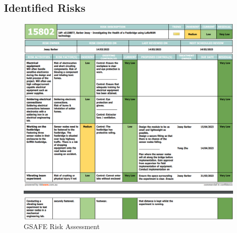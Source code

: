 \clearpage
\subsection{Identified Risks} 

\begin{figure}[h!]
\centering
\includegraphics[scale=0.6,angle=90,origin=c]{Images/Risks.png}
\caption{GSAFE Risk Assessment}
\label{fig:GSAFE}
\end{figure}



